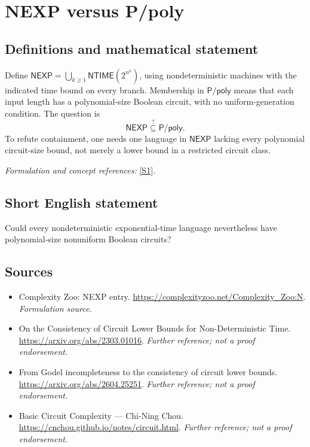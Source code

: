 \documentclass[11pt]{article}
\begin{document}
\section*{\texorpdfstring{NEXP versus P/poly}{NEXP versus P/poly}}\label{statement}
\subsection{Definitions and mathematical statement}
Define $\mathsf{NEXP}=\bigcup_{k\ge1}\mathsf{NTIME}(2^{n^k})$, using nondeterministic machines with the indicated time bound on every branch. Membership in $\mathsf{P/poly}$ means that each input length has a polynomial-size Boolean circuit, with no uniform-generation condition. The question is
\[
 \mathsf{NEXP}\stackrel{?}{\subseteq}\mathsf{P/poly}.
\]
To refute containment, one needs one language in $\mathsf{NEXP}$ lacking every polynomial circuit-size bound, not merely a lower bound in a restricted circuit class.
\par\smallskip\textit{Formulation and concept references:} \href{https://complexityzoo.net/Complexity_Zoo:N}{[S1]}.

\subsection{Short English statement}
Could every nondeterministic exponential-time language nevertheless have polynomial-size nonuniform Boolean circuits?
\subsection{Sources}
\begin{itemize}
\item[S1]Complexity Zoo: NEXP entry.
\url{https://complexityzoo.net/Complexity_Zoo:N}.
\textit{Formulation source.}
\item[S2]On the Consistency of Circuit Lower Bounds for Non-Deterministic Time.
\url{https://arxiv.org/abs/2303.01016}.
\textit{Further reference; not a proof endorsement.}
\item[S3]From Godel incompleteness to the consistency of circuit lower bounds.
\url{https://arxiv.org/abs/2604.25251}.
\textit{Further reference; not a proof endorsement.}
\item[S4]Basic Circuit Complexity — Chi-Ning Chou.
\url{https://cnchou.github.io/notes/circuit.html}.
\textit{Further reference; not a proof endorsement.}
\end{itemize}
\end{document}
